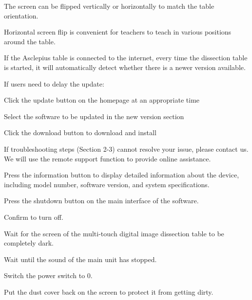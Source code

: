 \documentclass[11pt,a4paper]{article}
\begin{document}

The screen can be flipped vertically or horizontally to match the table orientation.


Horizontal screen flip is convenient for teachers to teach in various positions
around the table.


If the Asclepius table is connected to the internet, every time the dissection
table is started, it will automatically detect whether there is a newer version
available.


If users need to delay the update:
\begin{tbkList}
  \item Click the update button on the homepage at an appropriate time
  \item Select the software to be updated in the new version section
  \item Click the download button to download and install
\end{tbkList}


If troubleshooting steps (Section 2-3) cannot resolve your issue, please contact us.
We will use the remote support function to provide online assistance.


Press the information button  to display detailed information about
the device, including model number, software version, and system specifications.



\begin{tbkSteps}
  \item Press the shutdown button on the main interface of the software.
  \item Confirm to turn off.
  \item Wait for the screen of the multi-touch digital image dissection table
        to be completely dark.
  \item Wait until the sound of the main unit has stopped.
  \item Switch the power switch to 0.
  \item Put the dust cover back on the screen to protect it from getting dirty.
\end{tbkSteps}
\end{document}
